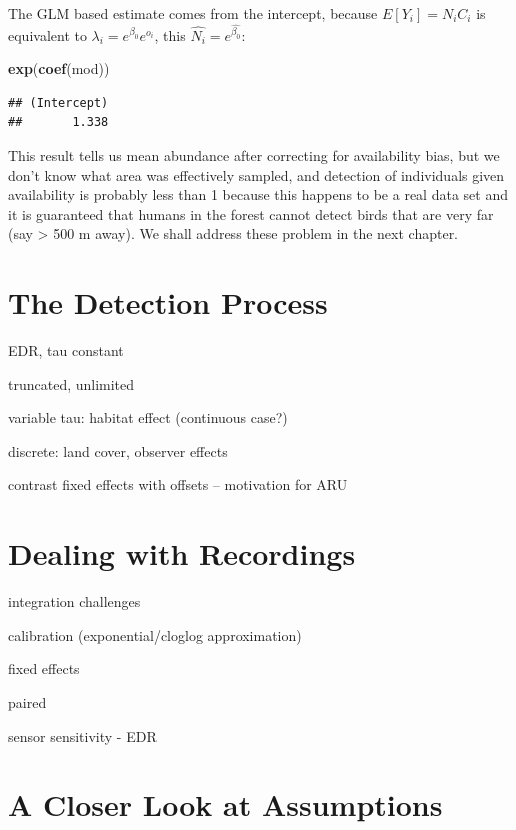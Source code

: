 \documentclass[12pt,]{book}
\newenvironment{Shaded}{\begin{snugshade}}{\end{snugshade}}
\newcommand{\KeywordTok}[1]{\textcolor[rgb]{0.13,0.29,0.53}{\textbf{#1}}}
\newcommand{\NormalTok}[1]{#1}
\begin{document}
The GLM based estimate comes from the intercept, because
\(E[Y_i]=N_i C_i\) is equivalent to \(\lambda_i=e^{\beta_0} e^{o_i}\),
this \(\hat{N_i}=e^{\hat{\beta_0}}\):

\begin{Shaded}
\begin{Highlighting}[]
\KeywordTok{exp}\NormalTok{(}\KeywordTok{coef}\NormalTok{(mod))}
\end{Highlighting}
\end{Shaded}

\begin{verbatim}
## (Intercept) 
##       1.338
\end{verbatim}

This result tells us mean abundance after correcting for availability
bias, but we don't know what area was effectively sampled,
and detection of individuals given availability is probably less than 1
because this happens to be a real data set and it is guaranteed that
humans in the forest cannot detect birds that are very far (say \textgreater{} 500 m away).
We shall address these problem in the next chapter.

\hypertarget{detection}{%
\chapter{The Detection Process}\label{detection}}

EDR, tau constant

truncated, unlimited

variable tau: habitat effect (continuous case?)

discrete: land cover, observer effects

contrast fixed effects with offsets -- motivation for ARU

\hypertarget{recordings}{%
\chapter{Dealing with Recordings}\label{recordings}}

integration challenges

calibration (exponential/cloglog approximation)

fixed effects

paired

sensor sensitivity - EDR

\hypertarget{assumptions}{%
\chapter{A Closer Look at Assumptions}\label{assumptions}}
\end{document}

